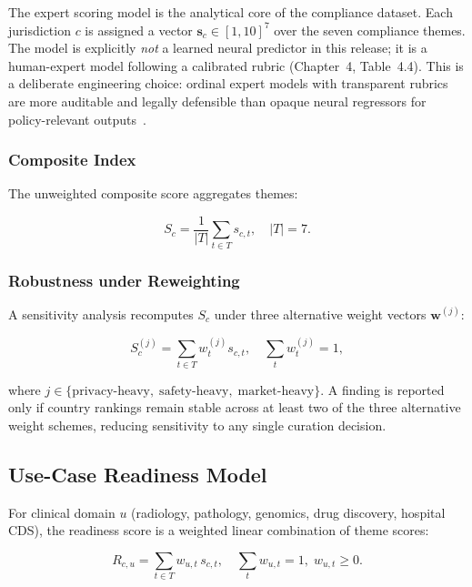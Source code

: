 The expert scoring model is the analytical core of the compliance dataset. Each
jurisdiction $c$ is assigned a vector $\mathbf{s}_c \in [1,10]^7$ over the seven
compliance themes. The model is explicitly \emph{not} a learned neural predictor in
this release; it is a human-expert model following a calibrated rubric (Chapter~4,
Table~4.4). This is a deliberate engineering choice: ordinal expert models with
transparent rubrics are more auditable and legally defensible than opaque neural
regressors for policy-relevant outputs~\cite{rudin2019}.

\subsubsection{Composite Index}

The unweighted composite score aggregates themes:

\begin{equation}
\label{eq:composite-full}
S_c = \frac{1}{|T|}\sum_{t \in T} s_{c,t}, \quad |T|=7.
\end{equation}

\subsubsection{Robustness under Reweighting}

A sensitivity analysis recomputes $S_c$ under three alternative weight vectors
$\mathbf{w}^{(j)}$:

\begin{equation}
\label{eq:reweight}
S_c^{(j)} = \sum_{t\in T} w_t^{(j)} s_{c,t},
\quad \sum_t w_t^{(j)} = 1,
\end{equation}

where $j \in \{\text{privacy-heavy},\;\text{safety-heavy},\;\text{market-heavy}\}$.
A finding is reported only if country rankings remain stable across at least two of
the three alternative weight schemes, reducing sensitivity to any single curation
decision.

\subsection{Use-Case Readiness Model}
\label{sec:ai-usecase}

For clinical domain $u$ (radiology, pathology, genomics, drug discovery, hospital
CDS), the readiness score is a weighted linear combination of theme scores:

\begin{equation}
\label{eq:readiness}
R_{c,u} = \sum_{t\in T} w_{u,t}\, s_{c,t},
\quad \sum_t w_{u,t} = 1,\; w_{u,t} \ge 0.
\end{equation}

